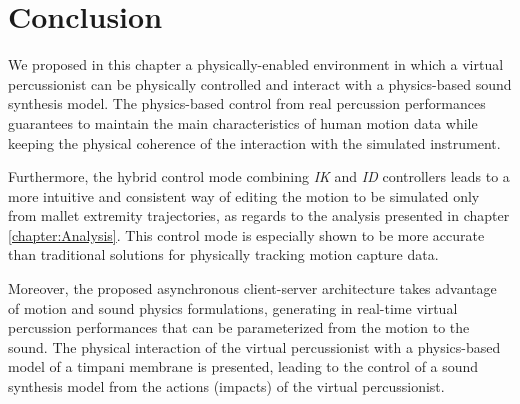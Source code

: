 


	\section{Conclusion}
	\label{sec:Synthesis_Conclusion}

We proposed in this chapter a physically-enabled environment in which a virtual percussionist can be physically controlled and interact with a physics-based sound synthesis model. The physics-based control from real percussion performances guarantees to maintain the main characteristics of human motion data while keeping the physical coherence of the interaction with the simulated instrument.

Furthermore, the hybrid control mode combining \emph{IK} and \emph{ID} controllers leads to a more intuitive and consistent way of editing the motion to be simulated only from mallet extremity trajectories, as regards to the analysis presented in chapter \ref{chapter:Analysis}. This control mode is especially shown to be more accurate than traditional solutions for physically tracking motion capture data. %

Moreover, the proposed asynchronous client-server architecture takes advantage of motion and sound physics formulations, generating in real-time virtual percussion performances that can be parameterized from the motion to the sound. The physical interaction of the virtual percussionist with a physics-based model of a timpani membrane is presented, leading to the control of a sound synthesis model from the actions (impacts) of the virtual percussionist. %









